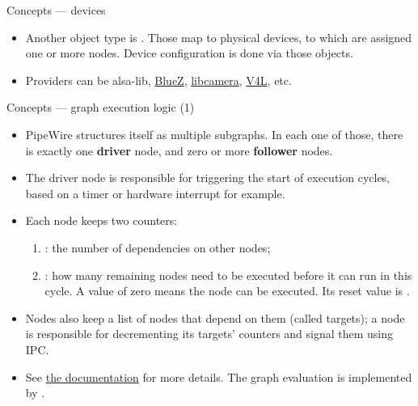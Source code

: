 \begin{frame}{Concepts — devices}
  \begin{itemize}

  \item Another object type is . Those map to physical
    devices, to which are assigned one or more nodes. Device
    configuration is done via those objects.

  \item Providers can be alsa-lib, \href{http://www.bluez.org/}{BlueZ},
    \href{https://libcamera.org/}{libcamera},
    \href{https://en.wikipedia.org/wiki/Video4Linux}{V4L}, etc.

  \end{itemize}
\end{frame}



\begin{frame}{Concepts — graph execution logic (1)}
  \begin{itemize}

  \item PipeWire structures itself as multiple subgraphs. In each one
    of those, there is exactly one \textbf{driver} node, and zero or
    more \textbf{follower} nodes.

  \item The driver node is responsible for triggering the start of
    execution cycles, based on a timer or hardware interrupt for example.

  \item Each node keeps two counters:
    \begin{enumerate}
    \item {}: the number of dependencies on other nodes;
    \item {}: how many remaining nodes need to be executed
      before it can run in this cycle. A value of zero means the node
      can be executed. Its reset value is .
    \end{enumerate}

  \item Nodes also keep a list of nodes that depend on them (called
    targets); a node is responsible for decrementing its targets'
     counters and signal them using IPC.

  \item See \href{https://docs.pipewire.org/page_scheduling.html}{the
    documentation} for more details. The graph evaluation is
    implemented by .

  \end{itemize}
\end{frame}



